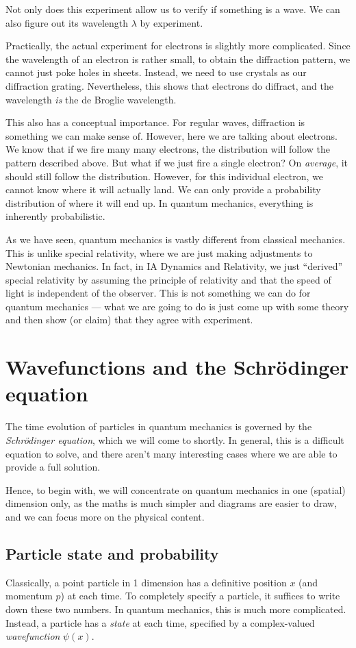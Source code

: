 \documentclass[a4paper]{article}
\begin{document}
Not only does this experiment allow us to verify if something is a wave. We can also figure out its wavelength $\lambda$ by experiment.

Practically, the actual experiment for electrons is slightly more complicated. Since the wavelength of an electron is rather small, to obtain the diffraction pattern, we cannot just poke holes in sheets. Instead, we need to use crystals as our diffraction grating. Nevertheless, this shows that electrons do diffract, and the wavelength \emph{is} the de Broglie wavelength.

This also has a conceptual importance. For regular waves, diffraction is something we can make sense of. However, here we are talking about electrons. We know that if we fire many many electrons, the distribution will follow the pattern described above. But what if we just fire a single electron? On \emph{average}, it should still follow the distribution. However, for this individual electron, we cannot know where it will actually land. We can only provide a probability distribution of where it will end up. In quantum mechanics, everything is inherently probabilistic.

As we have seen, quantum mechanics is vastly different from classical mechanics. This is unlike special relativity, where we are just making adjustments to Newtonian mechanics. In fact, in IA Dynamics and Relativity, we just ``derived'' special relativity by assuming the principle of relativity and that the speed of light is independent of the observer. This is not something we can do for quantum mechanics --- what we are going to do is just come up with some theory and then show (or claim) that they agree with experiment.

\section{Wavefunctions and the Schr\texorpdfstring{\"o}{o}dinger equation}
The time evolution of particles in quantum mechanics is governed by the \emph{Schr\"odinger equation}, which we will come to shortly. In general, this is a difficult equation to solve, and there aren't many interesting cases where we are able to provide a full solution.

Hence, to begin with, we will concentrate on quantum mechanics in one (spatial) dimension only, as the maths is much simpler and diagrams are easier to draw, and we can focus more on the physical content.

\subsection{Particle state and probability}
Classically, a point particle in 1 dimension has a definitive position $x$ (and momentum $p$) at each time. To completely specify a particle, it suffices to write down these two numbers. In quantum mechanics, this is much more complicated. Instead, a particle has a \emph{state} at each time, specified by a complex-valued \emph{wavefunction} $\psi(x)$.
\end{document}
